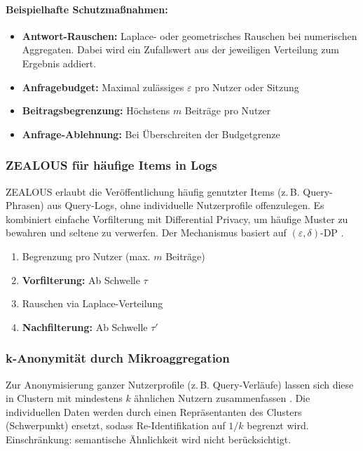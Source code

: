 \paragraph{Beispielhafte Schutzmaßnahmen:}
\begin{itemize}
\item \textbf{Antwort-Rauschen:} Laplace- oder geometrisches Rauschen bei numerischen Aggregaten. Dabei wird ein Zufallswert aus der jeweiligen Verteilung zum Ergebnis addiert.
\item \textbf{Anfragebudget:} Maximal zulässiges $\varepsilon$ pro Nutzer oder Sitzung
\item \textbf{Beitragsbegrenzung:} Höchstens $m$ Beiträge pro Nutzer
\item \textbf{Anfrage-Ablehnung:} Bei Überschreiten der Budgetgrenze
\end{itemize}

\subsubsection{ZEALOUS für häufige Items in Logs}

ZEALOUS erlaubt die Veröffentlichung häufig genutzter Items (z.\,B. Query-Phrasen) aus Query-Logs, ohne individuelle Nutzerprofile offenzulegen. Es kombiniert einfache Vorfilterung mit Differential Privacy, um häufige Muster zu bewahren und seltene zu verwerfen. Der Mechanismus basiert auf $(\varepsilon,\delta)$-DP \cite{GoetzZealous}.

\begin{enumerate}
\item Begrenzung pro Nutzer (max. $m$ Beiträge)
\item \textbf{Vorfilterung:} Ab Schwelle $\tau$
\item Rauschen via Laplace-Verteilung
\item \textbf{Nachfilterung:} Ab Schwelle $\tau'$
\end{enumerate}

\subsubsection{k-Anonymität durch Mikroaggregation}

Zur Anonymisierung ganzer Nutzerprofile (z.\,B. Query-Verläufe) lassen sich diese in Clustern mit mindestens $k$ ähnlichen Nutzern zusammenfassen \cite{NavarroUserKAnon}. Die individuellen Daten werden durch einen Repräsentanten des Clusters (Schwerpunkt) ersetzt, sodass Re-Identifikation auf $1/k$ begrenzt wird. Einschränkung: semantische Ähnlichkeit wird nicht berücksichtigt.


